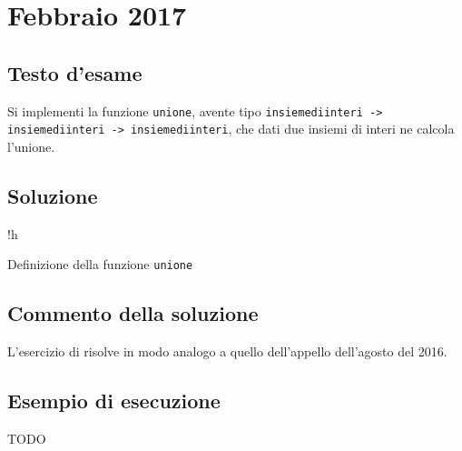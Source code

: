 \section{Febbraio 2017}

\subsection{Testo d'esame}

Si implementi la funzione \texttt{unione}, avente tipo \texttt{insiemediinteri -> insiemediinteri -> insiemediinteri}, che dati due insiemi di interi ne calcola l'unione.

\subsection{Soluzione}

\begin{listing}{!h}
\caption[]{Definizione della funzione \texttt{unione}}
\end{listing}

\subsection{Commento della soluzione}

L'esercizio di risolve in modo analogo a quello dell'appello dell'agosto del 2016.

\subsection*{Esempio di esecuzione}

TODO
